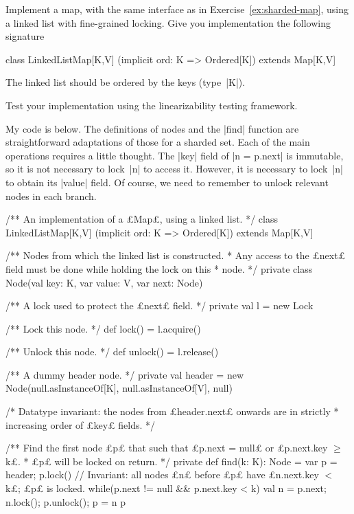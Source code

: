 \begin{question}
Implement a map, with the same interface as in Exercise~\ref{ex:sharded-map},
using a linked list with fine-grained locking.  Give you implementation the
following signature
\begin{scala}
class LinkedListMap[K,V] (implicit ord: K => Ordered[K]) extends Map[K,V]
\end{scala}
%
The linked list should be ordered by the keys (type~|K|).

Test your implementation using the linearizability testing framework. 
\end{question}


\begin{answerI}
My code is below.  The definitions of nodes and the |find| function are
straightforward adaptations of those for a sharded set.  Each of the main
operations requires a little thought.  The |key| field of |n = p.next| is
immutable, so it is not necessary to lock~|n| to access it.  However, it is
necessary to lock~|n| to obtain its |value| field.  Of course, we need to
remember to unlock relevant nodes in each branch. 


\begin{scala}
/** An implementation of a £Map£, using a linked list. */
class LinkedListMap[K,V] (implicit ord: K => Ordered[K]) extends Map[K,V]{
  /** Nodes from which the linked list is constructed.
    * Any access to the £next£ field must be done while holding the lock on this 
    * node.  */
  private class Node(val key: K, var value: V, var next: Node){
    /** A lock used to protect the £next£ field. */
    private val l = new Lock

    /** Lock this node. */
    def lock() = l.acquire()

    /** Unlock this node. */
    def unlock() = l.release()
  }

  /** A dummy header node. */
  private val header = new Node(null.asInstanceOf[K], null.asInstanceOf[V], null)

  /* Datatype invariant: the nodes from £header.next£ onwards are in strictly
   * increasing order of £key£ fields. */ 

  /** Find the first node £p£ that such that £p.next = null£ or £p.next.key $\ge$ k£.
    * £p£ will be locked on return. */  
  private def find(k: K): Node = {
    var p = header; p.lock()
    // Invariant: all nodes £n£ before £p£ have £n.next.key $<$ k£; £p£ is locked.
    while(p.next != null && p.next.key < k){
      val n = p.next; n.lock(); p.unlock(); p = n
    }
    p
  }

}
\end{scala}
\end{answerI}
